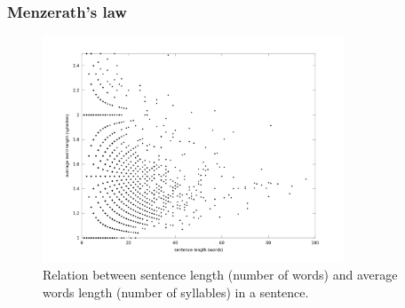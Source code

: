 \documentclass{beamer}
\begin{document}
\frame
{
  \frametitle{Menzerath's law}
  \vspace{-0.3cm}
  \begin{figure}[h]
  \centering
  \includegraphics[width=0.8\textwidth]{images/ulysses_words_sentence_word_length_syllables_z100.png}
  \caption{Relation between sentence length (number of words) and average words length (number of syllables) in a sentence.}
  \label{fig:ulysses_words_sentence_word_length}
  \end{figure}
}
\end{document}
